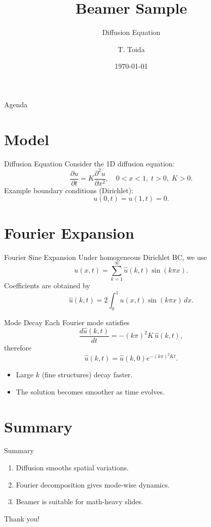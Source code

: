 \documentclass[aspectratio=169,11pt]{beamer}
\title{Beamer Sample}
\subtitle{Diffusion Equation}
\author{T. Toida}
\institute{Simulation Engineering}
\date{\today}
\begin{document}
\begin{frame}
  \titlepage
\end{frame}

\begin{frame}{Agenda}
  \tableofcontents
\end{frame}

\section{Model}

\begin{frame}{Diffusion Equation}
  Consider the 1D diffusion equation:
  \[
    \frac{\partial u}{\partial t} = K\frac{\partial^2 u}{\partial x^2},
    \quad 0 < x < 1,\; t > 0,\; K > 0.
  \]
  Example boundary conditions (Dirichlet):
  \[
    u(0,t)=u(1,t)=0.
  \]
\end{frame}

\section{Fourier Expansion}

\begin{frame}{Fourier Sine Expansion}
  Under homogeneous Dirichlet BC, we use
  \[
    u(x,t)=\sum_{k=1}^{\infty}\hat{u}(k,t)\sin(k\pi x).
  \]
  Coefficients are obtained by
  \[
    \hat{u}(k,t)=2\int_0^1 u(x,t)\sin(k\pi x)\,dx.
  \]
\end{frame}

\begin{frame}{Mode Decay}
  Each Fourier mode satisfies
  \[
    \frac{d\hat{u}(k,t)}{dt}=-(k\pi)^2K\,\hat{u}(k,t),
  \]
  therefore
  \[
    \hat{u}(k,t)=\hat{u}(k,0)e^{-(k\pi)^2Kt}.
  \]
  \begin{itemize}
    \item Large $k$ (fine structures) decay faster.
    \item The solution becomes smoother as time evolves.
  \end{itemize}
\end{frame}

\section{Summary}

\begin{frame}{Summary}
  \begin{enumerate}
    \item Diffusion smooths spatial variations.
    \item Fourier decomposition gives mode-wise dynamics.
    \item Beamer is suitable for math-heavy slides.
  \end{enumerate}
\end{frame}

\begin{frame}
  \centering
  {\Huge Thank you!}
\end{frame}
\end{document}
